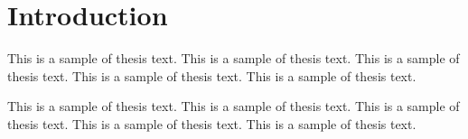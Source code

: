 \chapter{Introduction}
This is a sample of thesis text. This is a sample of thesis text. This is a 
sample of thesis text. This is a sample of thesis text. This is a sample of
thesis text.

This is a sample of thesis text. This is a sample of thesis text. This is a 
sample of thesis text. This is a sample of thesis text. This is a sample of
thesis text.
